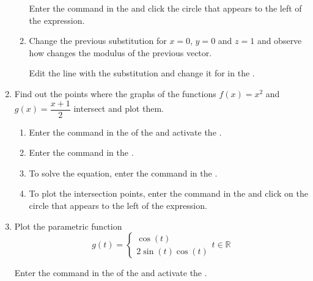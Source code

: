\begin{enumerate}
\begin{enumerate}
\begin{indication}
            Enter the command \command{|\$|} in the  and click the circle that appears to the left of the expression.
            \end{indication}
      \item Change the previous substitution for $x=0$, $y=0$ and $z=1$ and observe how changes the modulus of the previous vector.
            \begin{indication}
            Edit the line with the substitution and change it for  in the .
            \end{indication}
      \end{enumerate}

\item Find out the points where the graphs of the functions $f(x)=x^2$ and $g(x)=\dfrac{x+1}{2}$ intersect and plot them.
      \begin{enumerate}
      \item Enter the command  in the  of the  and activate the .
      \item Enter the command  in the .
      \item To solve the equation, enter the command  in the .
      \item To plot the intersection points, enter the command  in the  and click on the circle that appears to the left of the expression.
      \end{enumerate}

\item Plot the parametric function
      \[
      g(t)=
      \begin{cases}
      \cos(t) \\
      2\sin(t)\cos(t)
      \end{cases}
      t\in \mathbb{R}
      \]

      \begin{indication}
      Enter the command  in the  of the  and activate the .
      \end{indication}


\end{enumerate}
